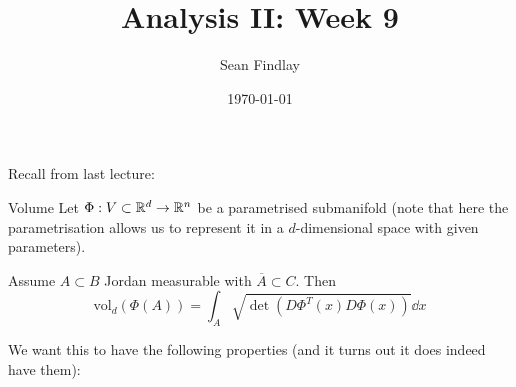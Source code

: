 \documentclass[12pt]{article}
\title{Analysis II: Week 9}
\author{Sean Findlay}
\date{\today}
\begin{document}
\maketitle

Recall from last lecture:

\begin{definition}{Volume}{}
    Let $\Phi: V \subset \mathbb{R}^d \rightarrow \mathbb{R}^n$ be a parametrised submanifold (note that here the parametrisation allows us to represent it in a $d$-dimensional space with given parameters).

    Assume $A \subset B$ Jordan measurable with $\overline{A} \subset C$. Then
    $$
        \mathrm{vol}_d(\Phi(A)) = \int_A \sqrt{\det \left(D \Phi^T(x) D \Phi(x)\right)} \dd x
    $$
\end{definition}

We want this to have the following properties (and it turns out it does indeed have them):
\end{document}
